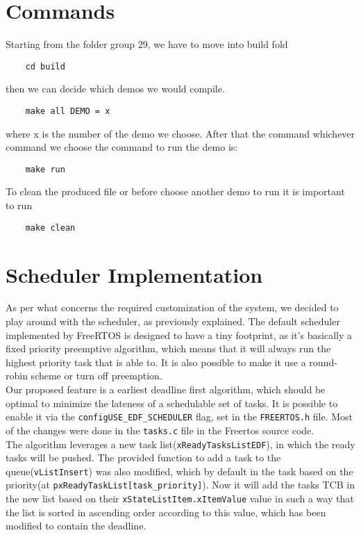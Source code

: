 \documentclass{article}
\begin{document}
\section{Commands}
Starting from the folder group 29, we have to move into build fold
\begin{verbatim}
    cd build    
\end{verbatim}

then we can decide which demos we would compile.

\begin{verbatim}
    make all DEMO = x
\end{verbatim}
where x is the number of the demo we choose. After that the command whichever command we choose the command to run the demo is:
\begin{verbatim}
    make run
\end{verbatim}
To clean the produced file or before choose another demo to run it is important to run

\begin{verbatim}
    make clean
\end{verbatim}

\section{Scheduler Implementation}
As per what concerns the required customization of the system, we decided to play around with the scheduler, as previously explained. The default scheduler implemented by FreeRTOS is designed to have a tiny footprint, as it's basically a fixed priority preemptive algorithm, which means that it will always run the highest priority task that is able to. It is also possible to make it use a round-robin scheme or turn off preemption.\\
Our proposed feature is a earliest deadline first algorithm, which should be optimal to minimize the lateness of a schedulable set of tasks. It is possible to enable it via the \texttt{configUSE_EDF_SCHEDULER} flag, set in the \texttt{FREERTOS.h} file. Most of the changes were done in the \texttt{tasks.c} file in the Freertos source code.\\
The algorithm leverages a new task list(\texttt{xReadyTasksListEDF}), in which the ready tasks will be pushed. The provided function to add a task to the queue(\texttt{vListInsert}) was also modified, which by default in the task based on the priority(at \texttt{pxReadyTaskList[task_priority]}). Now it will add the tasks TCB in the new list based on their \texttt{xStateListItem.xItemValue} value in such a way that the list is sorted in ascending order according to this value, which has been modified to contain the deadline.\\
\end{document}
